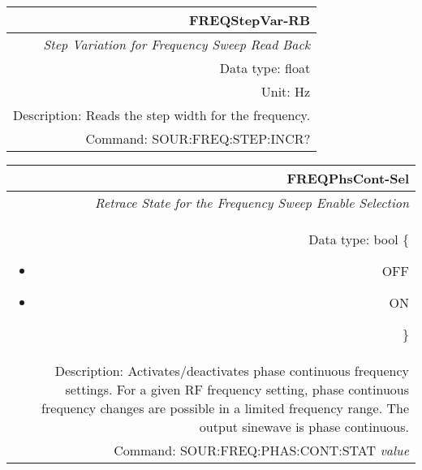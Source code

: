 \documentclass[openany]{article}
\begin{document}
		\begin{tabular}{N}
			\hline
			\bfseries FREQStepVar-RB \\ \hline
			\emph{Step Variation for Frequency Sweep Read Back} \\
			Data type: float \\
			Unit: Hz \\
			Description: Reads the step width for the frequency. \\
			Command: SOUR:FREQ:STEP:INCR? \\

		\end{tabular}
%
		\begin{tabular}{N}
			\hline
			\bfseries FREQPhsCont-Sel \\ \hline
			\emph{Retrace State for the Frequency Sweep Enable Selection} \\
			Data type: bool \{\begin{itemize}[noitemsep]
				\small
				\item[] OFF
				\item[] ON
			\end{itemize}\} \\
			Description: Activates/deactivates phase continuous frequency settings. For a given RF frequency setting, phase continuous frequency changes are possible in a limited frequency range. The output sinewave is phase continuous. \\
			Command: SOUR:FREQ:PHAS:CONT:STAT \emph{value} \\

		\end{tabular}
\end{document}
